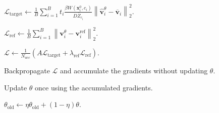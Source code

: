 \begin{algorithm}[H]
\begin{algorithmic}[1]
        \State $\displaystyle
        \mathcal{L}_{\mathrm{target}}
        \leftarrow
        \frac{1}{B}
        \sum_{i=1}^{B}
        t_i
        \frac{
        \beta
        W(\mathbf{x}_i^0,c_i)
        }{
        D\bar{Z}_{c_i}
        }
        \left\|
        \widehat{\mathbf{v}}_{i}^{\theta}
        -
        \overline{\mathbf{v}}_{i}
        \right\|_2^2
        .$

        
        \State $\displaystyle
        \mathcal{L}_{\mathrm{ref}}
        \leftarrow
        \frac{1}{B}
        \sum_{i=1}^{B}
        \left\|
        \mathbf{v}_i^{\theta}
        -
        \mathbf{v}_i^{\mathrm{ref}}
        \right\|_2^2$.

        \State $\mathcal{L}
        \leftarrow
        \frac{1}{N_{acc}}(A \mathcal{L}_{\mathrm{target}}
        +
        \lambda_{\mathrm{ref}}
        \mathcal{L}_{\mathrm{ref}})$.

        \State Backpropagate $\mathcal{L}$ and accumulate the gradients
        without updating $\theta$.
    \EndFor

    \State Update $\theta$ once using the accumulated gradients.

    \State $\theta_{\mathrm{old}}
    \leftarrow
    \eta\theta_{\mathrm{old}}
    +(1-\eta)\theta$.
\EndFor
\end{algorithmic}
\end{algorithm}

